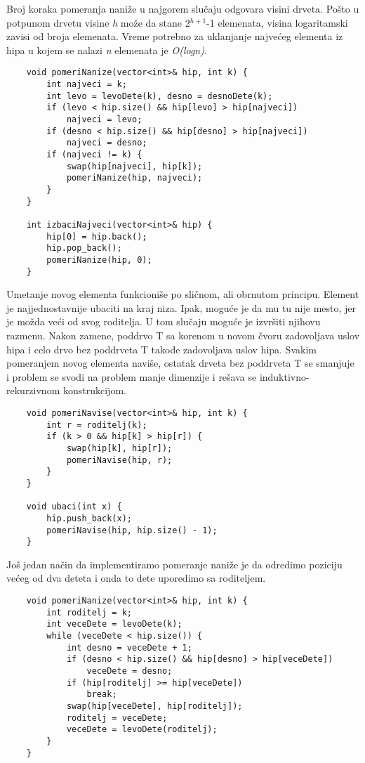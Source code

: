 \documentclass{article}
\begin{document}
Broj koraka pomeranja naniže u najgorem slučaju odgovara visini drveta. Pošto u
potpunom drvetu visine \textit{h} može da stane 2$^{h+1}$-1 elemenata, visina logaritamski
zavisi od broja elemenata. Vreme potrebno za uklanjanje najvećeg
elementa iz hipa u kojem se nalazi \textit{n} elemenata je \textit{O(logn)}.
\newpage
\begin{lstlisting}
    void pomeriNanize(vector<int>& hip, int k) {
        int najveci = k;
        int levo = levoDete(k), desno = desnoDete(k);
        if (levo < hip.size() && hip[levo] > hip[najveci])
            najveci = levo;
        if (desno < hip.size() && hip[desno] > hip[najveci])
            najveci = desno;
        if (najveci != k) {
            swap(hip[najveci], hip[k]);
            pomeriNanize(hip, najveci);
        }
    }

    int izbaciNajveci(vector<int>& hip) {
        hip[0] = hip.back();
        hip.pop_back();
        pomeriNanize(hip, 0);
    }
\end{lstlisting}
Umetanje novog elementa funkcioniše po sličnom, ali obrnutom principu. Element
je najjednostavnije ubaciti na kraj niza. Ipak, moguće je da mu tu nije mesto,
jer je možda veći od svog roditelja. U tom slučaju moguće je izvršiti njihovu
razmenu. Nakon zamene, poddrvo T sa korenom u novom čvoru zadovoljava
uslov hipa i celo drvo bez poddrveta T takođe zadovoljava uslov hipa. Svakim
pomeranjem novog elementa naviše, ostatak drveta bez poddrveta T se smanjuje i
problem se svodi na problem manje dimenzije i rešava se induktivno-rekurzivnom
konstrukcijom.
\begin{lstlisting}
    void pomeriNavise(vector<int>& hip, int k) {
        int r = roditelj(k);
        if (k > 0 && hip[k] > hip[r]) {
            swap(hip[k], hip[r]);
            pomeriNavise(hip, r);
        }
    }

    void ubaci(int x) {
        hip.push_back(x);
        pomeriNavise(hip, hip.size() - 1);
    }
\end{lstlisting}
Još jedan način da implementiramo pomeranje naniže je da odredimo poziciju
većeg od dva deteta i onda to dete uporedimo sa roditeljem.
\begin{lstlisting}
    void pomeriNanize(vector<int>& hip, int k) {
        int roditelj = k;
        int veceDete = levoDete(k);
        while (veceDete < hip.size()) {
            int desno = veceDete + 1;
            if (desno < hip.size() && hip[desno] > hip[veceDete])
                veceDete = desno;
            if (hip[roditelj] >= hip[veceDete])
                break;
            swap(hip[veceDete], hip[roditelj]);
            roditelj = veceDete;
            veceDete = levoDete(roditelj);
        }
    }
\end{lstlisting}
\end{document}
